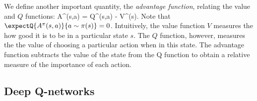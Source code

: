 We define another important quantity, the {\it advantage function}, relating the value and $Q$ functions:
\be
\label{eq:advantage}
A^{\pi}(s,a) = Q^{\pi}(s,a) - V^{\pi}(s).
\ee
Note that $\expectQ{A^{\pi}(s,a)}{a \sim \pi(s)} = 0$. Intuitively, the value function $V$ measures the how good it is to be in a particular state $s$. The $Q$ function, however, measures the the value of choosing a particular action when in this state. The advantage function subtracts the value of the state from the Q function to obtain a relative measure of the importance of each action.



\subsection{Deep Q-networks}
\label{sec:dqn}

